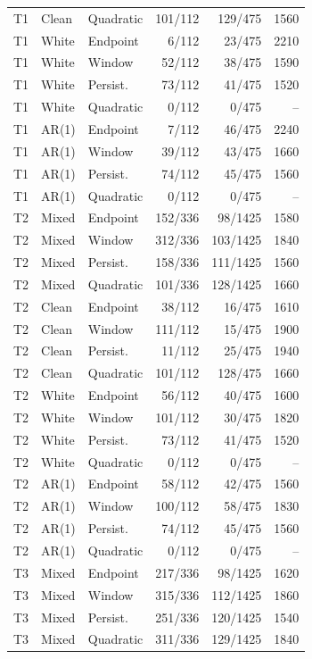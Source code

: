 \documentclass[10pt]{article}
\begin{document}
\begin{longtable}{lllrrr}
T1 & Clean & Quadratic & 101/112 & 129/475 & 1560 \\
T1 & White & Endpoint & 6/112 & 23/475 & 2210 \\
T1 & White & Window & 52/112 & 38/475 & 1590 \\
T1 & White & Persist. & 73/112 & 41/475 & 1520 \\
T1 & White & Quadratic & 0/112 & 0/475 & -- \\
T1 & AR(1) & Endpoint & 7/112 & 46/475 & 2240 \\
T1 & AR(1) & Window & 39/112 & 43/475 & 1660 \\
T1 & AR(1) & Persist. & 74/112 & 45/475 & 1560 \\
T1 & AR(1) & Quadratic & 0/112 & 0/475 & -- \\
T2 & Mixed & Endpoint & 152/336 & 98/1425 & 1580 \\
T2 & Mixed & Window & 312/336 & 103/1425 & 1840 \\
T2 & Mixed & Persist. & 158/336 & 111/1425 & 1560 \\
T2 & Mixed & Quadratic & 101/336 & 128/1425 & 1660 \\
T2 & Clean & Endpoint & 38/112 & 16/475 & 1610 \\
T2 & Clean & Window & 111/112 & 15/475 & 1900 \\
T2 & Clean & Persist. & 11/112 & 25/475 & 1940 \\
T2 & Clean & Quadratic & 101/112 & 128/475 & 1660 \\
T2 & White & Endpoint & 56/112 & 40/475 & 1600 \\
T2 & White & Window & 101/112 & 30/475 & 1820 \\
T2 & White & Persist. & 73/112 & 41/475 & 1520 \\
T2 & White & Quadratic & 0/112 & 0/475 & -- \\
T2 & AR(1) & Endpoint & 58/112 & 42/475 & 1560 \\
T2 & AR(1) & Window & 100/112 & 58/475 & 1830 \\
T2 & AR(1) & Persist. & 74/112 & 45/475 & 1560 \\
T2 & AR(1) & Quadratic & 0/112 & 0/475 & -- \\
T3 & Mixed & Endpoint & 217/336 & 98/1425 & 1620 \\
T3 & Mixed & Window & 315/336 & 112/1425 & 1860 \\
T3 & Mixed & Persist. & 251/336 & 120/1425 & 1540 \\
T3 & Mixed & Quadratic & 311/336 & 129/1425 & 1840 \\

\end{longtable}
\end{document}
